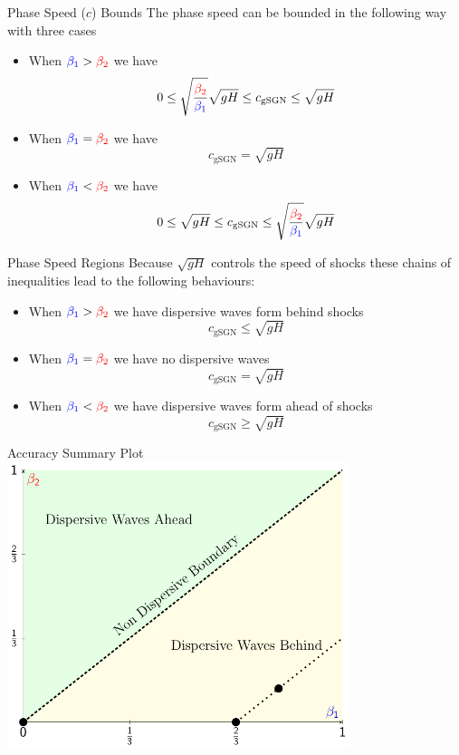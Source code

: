 \documentclass[pdf]{beamer}
\begin{document}
\begin{frame}{Phase Speed ($c$) Bounds}
The phase speed can be bounded in the following way with three cases %
\begin{itemize}
	\item When ${\color{blue}\beta_1 } > {\color{red}\beta_2 }$ we have
	\begin{align*}
0 \le \sqrt{\frac{{\color{red}\beta_2 }}{{\color{blue}\beta_1 }}} \sqrt{gH} \le  c_{\text{gSGN}} \le  \sqrt{gH}
	\end{align*} 
	\item When ${\color{blue}\beta_1 } = {\color{red}\beta_2 }$ we have
	\[c_{\text{gSGN}} = \sqrt{gH}\]
	\item When ${\color{blue}\beta_1 } < {\color{red}\beta_2 }$ we have
	\[ 0 \le  \sqrt{gH} \le c_{\text{gSGN}} \le \sqrt{\frac{{\color{red}\beta_2 }}{{\color{blue}\beta_1 }}} \sqrt{gH}  \]
\end{itemize}

\end{frame}


\begin{frame}{Phase Speed Regions }
Because $\sqrt{gH}$ controls the speed of shocks these chains of inequalities lead to the following behaviours:
\begin{itemize}
	\item When ${\color{blue}\beta_1 } > {\color{red}\beta_2 }$ we have dispersive waves form behind shocks
	\[c_{\text{gSGN}} \le  \sqrt{gH}\]
	\item When ${\color{blue}\beta_1 } = {\color{red}\beta_2 }$ we have no dispersive waves
	\[c_{\text{gSGN}} =  \sqrt{gH}\]
	\item When ${\color{blue}\beta_1 } < {\color{red}\beta_2 }$ we have dispersive waves form ahead of shocks 
	\[c_{\text{gSGN}} \ge  \sqrt{gH}\]
\end{itemize}
\end{frame}
\begin{frame}{Accuracy Summary Plot}
\centering
\includegraphics[width=0.75\textwidth]{./Pics/Tex/Explanatory/RegionsPlot/AccuracySummaryWithRegions.pdf}
\end{frame}
\end{document}
